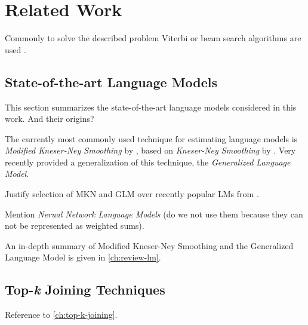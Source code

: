 \chapter{Related Work}

\begin{draft}
Commonly to solve the described problem Viterbi or beam search algorithms are
used .
\end{draft}


\section{State-of-the-art Language Models}

\begin{draft}
This section summarizes the state-of-the-art language models considered in this
work.
And their origins?
\end{draft}

The currently most commonly used \parencite{JurafskyMartin2009,Chelba2013}
technique for estimating language models is \emph{Modified Kneser-Ney Smoothing}
by \textcite{ChenGoodman1996,ChenGoodman1998,ChenGoodman1999}, based on
\emph{Kneser-Ney Smoothing} by \textcite{KneserNey1995}.
Very recently \textcite{Pickhardt2014} provided a generalization of this technique,
the \emph{Generalized Language Model}.

\begin{draft}
Justify selection of MKN and GLM over recently popular LMs from
\parencite{Chelba2013}.

Mention \emph{Nerual Network Language Models} \parencite{Bengio2003,Mikolov2012}
(do we not use them because they can not be represented as weighted sums).
\end{draft}

An in-depth summary of Modified Kneser-Ney Smoothing and the Generalized
Language Model is given in \cref{ch:review-lm}.

\section{Top-\emph{k} Joining Techniques}


\begin{draft}
Reference to \cref{ch:top-k-joining}.
\end{draft}
